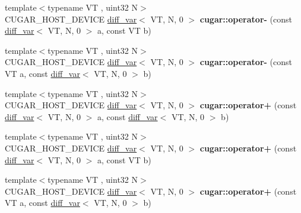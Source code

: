 \begin{DoxyCompactItemize}
\item 
\mbox{\label{group___auto_diff_module_gab39307c7ce7c5650bc2547bf3214cd75}} 
{\footnotesize template$<$typename VT , uint32 N$>$ }\\C\+U\+G\+A\+R\+\_\+\+H\+O\+S\+T\+\_\+\+D\+E\+V\+I\+CE \hyperlink{structcugar_1_1diff__var}{diff\+\_\+var}$<$ VT, N, 0 $>$ {\bfseries cugar\+::operator-\/} (const \hyperlink{structcugar_1_1diff__var}{diff\+\_\+var}$<$ VT, N, 0 $>$ a, const VT b)
\item 
\mbox{\label{group___auto_diff_module_gaaeb75173cad080e4482f6e59ce9aeb5d}} 
{\footnotesize template$<$typename VT , uint32 N$>$ }\\C\+U\+G\+A\+R\+\_\+\+H\+O\+S\+T\+\_\+\+D\+E\+V\+I\+CE \hyperlink{structcugar_1_1diff__var}{diff\+\_\+var}$<$ VT, N, 0 $>$ {\bfseries cugar\+::operator-\/} (const VT a, const \hyperlink{structcugar_1_1diff__var}{diff\+\_\+var}$<$ VT, N, 0 $>$ b)
\item 
\mbox{\label{group___auto_diff_module_gab102bbe50b8445b7f83662c8f6937f52}} 
{\footnotesize template$<$typename VT , uint32 N$>$ }\\C\+U\+G\+A\+R\+\_\+\+H\+O\+S\+T\+\_\+\+D\+E\+V\+I\+CE \hyperlink{structcugar_1_1diff__var}{diff\+\_\+var}$<$ VT, N, 0 $>$ {\bfseries cugar\+::operator+} (const \hyperlink{structcugar_1_1diff__var}{diff\+\_\+var}$<$ VT, N, 0 $>$ a, const \hyperlink{structcugar_1_1diff__var}{diff\+\_\+var}$<$ VT, N, 0 $>$ b)
\item 
\mbox{\label{group___auto_diff_module_ga42ddc80d7c77312b70817068c28cd556}} 
{\footnotesize template$<$typename VT , uint32 N$>$ }\\C\+U\+G\+A\+R\+\_\+\+H\+O\+S\+T\+\_\+\+D\+E\+V\+I\+CE \hyperlink{structcugar_1_1diff__var}{diff\+\_\+var}$<$ VT, N, 0 $>$ {\bfseries cugar\+::operator+} (const \hyperlink{structcugar_1_1diff__var}{diff\+\_\+var}$<$ VT, N, 0 $>$ a, const VT b)
\item 
\mbox{\label{group___auto_diff_module_gaf6a1e00acce6dc54f20c1da50b76c640}} 
{\footnotesize template$<$typename VT , uint32 N$>$ }\\C\+U\+G\+A\+R\+\_\+\+H\+O\+S\+T\+\_\+\+D\+E\+V\+I\+CE \hyperlink{structcugar_1_1diff__var}{diff\+\_\+var}$<$ VT, N, 0 $>$ {\bfseries cugar\+::operator+} (const VT a, const \hyperlink{structcugar_1_1diff__var}{diff\+\_\+var}$<$ VT, N, 0 $>$ b)

\end{DoxyCompactItemize}
